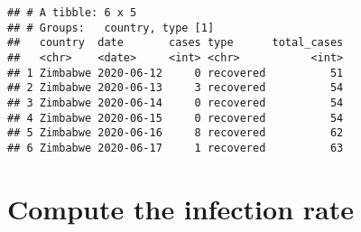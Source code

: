 \documentclass[
]{article}
\begin{document}
\begin{verbatim}
## # A tibble: 6 x 5
## # Groups:   country, type [1]
##   country  date       cases type      total_cases
##   <chr>    <date>     <int> <chr>           <int>
## 1 Zimbabwe 2020-06-12     0 recovered          51
## 2 Zimbabwe 2020-06-13     3 recovered          54
## 3 Zimbabwe 2020-06-14     0 recovered          54
## 4 Zimbabwe 2020-06-15     0 recovered          54
## 5 Zimbabwe 2020-06-16     8 recovered          62
## 6 Zimbabwe 2020-06-17     1 recovered          63
\end{verbatim}

\hypertarget{compute-the-infection-rate}{%
\section{Compute the infection rate}\label{compute-the-infection-rate}}
\end{document}
